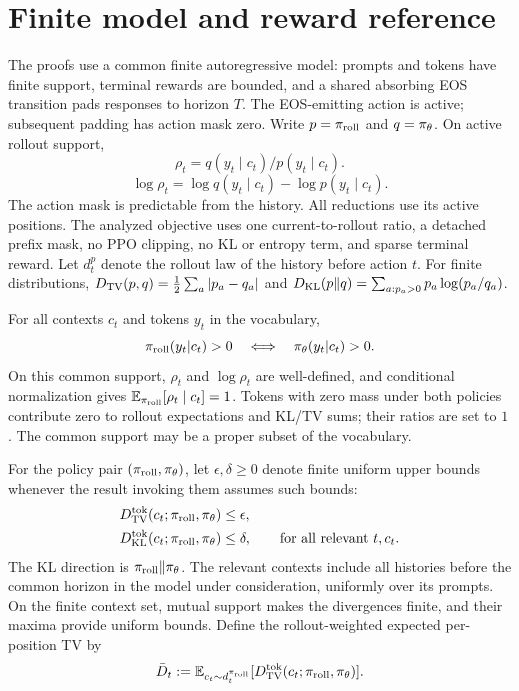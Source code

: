 \appendix
\section{Finite model and reward reference}
\label{sec:preliminaries}

The proofs use a common finite autoregressive model: prompts and tokens have finite support,
terminal rewards are bounded, and a shared absorbing EOS transition pads
responses to horizon $T$. The EOS-emitting action is active; subsequent padding has action mask zero. Write $p=\pi_{\mathrm{roll}}$ and $q=\pi_{\theta}$. On active rollout support,
\begin{equation}
 \rho_t=q(y_t\mid c_t)/p(y_t\mid c_t).
 \label{eq:ratio}
\end{equation}
\begin{equation}
 \log\rho_t=\log q(y_t\mid c_t)-\log p(y_t\mid c_t).
 \label{eq:log-ratio}
\end{equation}
The action mask is predictable from the history. All reductions use its
active positions. The analyzed objective uses one current-to-rollout ratio, a detached
prefix mask, no PPO clipping, no KL or entropy term, and sparse terminal reward.
Let $d_t^p$ denote the rollout law of the history before action $t$.
For finite distributions, $D_{\mathrm{TV}}(p,q)=\tfrac12\sum_a|p_a-q_a|$ and
$D_{\mathrm{KL}}(p\|q)=\sum_{a:p_a>0}p_a\log(p_a/q_a)$.

\begin{assumption}
\label{asm:support}
For all contexts $c_t$ and tokens $y_t$ in the vocabulary,
\begin{equation*}
    \pi_{\mathrm{roll}}(y_t|c_t) > 0
    \quad\Longleftrightarrow\quad
    \pi_{\theta}(y_t|c_t) > 0.
\end{equation*}
On this common support, $\rho_t$ and $\log\rho_t$ are well-defined,
and conditional normalization gives $\mathbb{E}_{\pi_{\mathrm{roll}}}[\rho_t\mid c_t]=1$.
Tokens with zero mass under both policies contribute zero to rollout
expectations and KL/TV sums; their ratios are set to $1$. The common
support may be a proper subset of the vocabulary.
\end{assumption}

\begin{definition}
\label{def:max-div}
For the policy pair $(\pi_{\mathrm{roll}},\pi_{\theta})$, let $\epsilon,\delta\ge0$ denote finite uniform upper bounds whenever the result invoking them assumes such bounds:
\begin{align*}
    D_{\mathrm{TV}}^{\mathrm{tok}}(c_t;\pi_{\mathrm{roll}},\pi_{\theta})&\le\epsilon, \\
    D_{\mathrm{KL}}^{\mathrm{tok}}(c_t;\pi_{\mathrm{roll}},\pi_{\theta})&\le\delta,
    \qquad \text{for all relevant }t,c_t.
\end{align*}
The KL direction is $\pi_{\mathrm{roll}}\|\pi_{\theta}$. The relevant contexts include all histories before the common horizon in the model under consideration, uniformly over its prompts. On the finite context set, mutual support makes the divergences finite, and their maxima provide uniform bounds.
Define the rollout-weighted expected per-position TV by
\[
    \bar{D}_t:=\mathbb{E}_{c_t\sim d_t^{\pi_{\mathrm{roll}}}}
      [D_{\mathrm{TV}}^{\mathrm{tok}}(c_t;\pi_{\mathrm{roll}},\pi_{\theta})].
\]
\end{definition}


